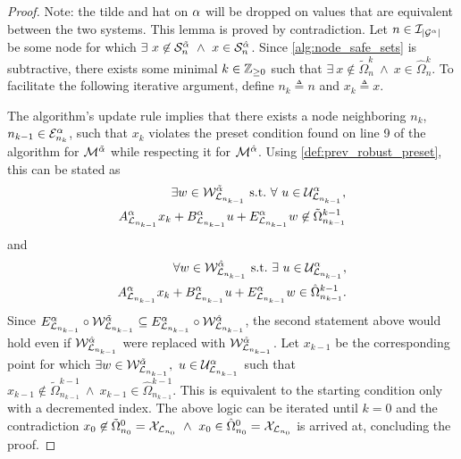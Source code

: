 \begin{proof}
Note: the tilde and hat on $\alpha$ will be dropped on values that are equivalent between the two systems. This lemma is proved by contradiction. Let $n\in\idxset{\gnumnodes[\agentidx]}$ be some node for which $\exists\ x\not\in\mathcal{S}_n^{\tilde{\agentidx}}\ \land\ x\in\mathcal{S}_n^{\hat{\agentidx}}$. Since \autoref{alg:node_safe_sets} is subtractive, there exists some minimal $k\in\mathbb{Z}_{\geq 0}$ such that $\exists\ x\not\in\tilde\Omega^k_{n}\ \land\ x\in\hat\Omega^k_{n}$. To facilitate the following iterative argument, define $n_k\triangleq n$ and $x_k\triangleq x$.

The algorithm's update rule implies that there exists a node neighboring $n_k$, $n_{k-1}\in\gnodeedges[\agentidx]{n_k}$, such that $x_k$ violates the preset condition found on line 9 of the algorithm for  $\mathcal{M}^{\tilde{\alpha}}$ while respecting it for  $\mathcal{M}^{\hat{\alpha}}$.  Using \autoref{def:prev_robust_preset}, this can be stated as
\begin{align*}
\exists w\in\wcon[{\gnodelabel{n_{k-1}}}]^{\tilde{\agentidx}}\ \st\ \forall\ u\in\ucon[{\gnodelabel{n_{k-1}}}]^\agentidx,\\ 
A_{\gnodelabel{n_{k-1}}}^\agentidx x_k+B_{\gnodelabel{n_{k-1}}}^\agentidx u + E_{\gnodelabel{n_{k-1}}}^\agentidx w \not\in \tilde\Omega^{k-1}_{{{n_{k-1}}}}
\end{align*}
and
\begin{align*}
\forall w\in\wcon[{\gnodelabel{n_{k-1}}}]^{\hat{\agentidx}}\ \st\ \exists\ u\in\ucon[{\gnodelabel{n_{k-1}}}]^\agentidx,\\ 
A_{\gnodelabel{n_{k-1}}}^\agentidx x_k+B_{\gnodelabel{n_{k-1}}}^\agentidx u + E_{\gnodelabel{n_{k-1}}}^\agentidx w \in \hat\Omega^{k-1}_{{{n_{k-1}}}}.
\end{align*}
Since $E_{\mathcal{L}_{n_{k-1}}}^{\alpha}\circ\mathcal{W}^{\tilde{\alpha}}_{\mathcal{L}_{n_{k-1}}}\subseteq E_{\mathcal{L}_{n_{k-1}}}^{\alpha}\circ\mathcal{W}^{\hat{\alpha}}_{\mathcal{L}_{n_{k-1}}}$, the second statement above would hold even if $\wcon[{\gnodelabel{n_{k-1}}}]^{\hat{\agentidx}}$ were replaced with $\wcon[{\gnodelabel{n_{k-1}}}]^{\tilde{\agentidx}}$. Let $x_{k-1}$ be the corresponding point for which $\exists w\in\wcon[{\gnodelabel{n_{k-1}}}]^{\tilde{\agentidx}},\ u\in\ucon[{\gnodelabel{n_{k-1}}}]^\agentidx$ such that $x_{k-1}\not\in\tilde\Omega^{k-1}_{n_{k-1}}\ \land\ x_{k-1}\in\hat\Omega^{k-1}_{n_{k-1}}$. This is equivalent to the starting condition only with a decremented index. The above logic can be iterated until $k=0$ and the contradiction $x_0\not\in\tilde\Omega^{0}_{n_0}=\xcon[\gnodelabel{n_0}]\ \land\ x_0\in\hat\Omega^{0}_{n_0}=\xcon[\gnodelabel{n_0}]$ is arrived at, concluding the proof. 
\end{proof}

